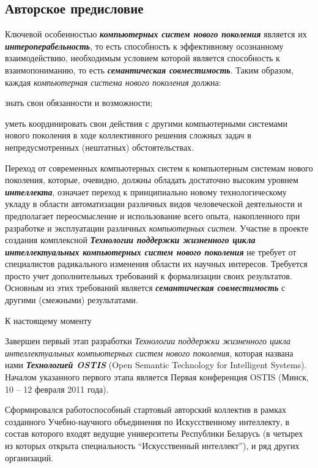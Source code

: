 \begin{partbacktext}
\part*{Авторское предисловие}
\label{chap_preface_auth}

Ключевой особенностью \textbf{\textit{компьютерных систем нового поколения}} является их \textbf{\textit{интероперабельность}}, то есть способность к эффективному осознанному взаимодействию, необходимым условием которой является способность к взаимопониманию, то есть \textbf{\textit{семантическая совместимость}}. Таким образом, каждая \textit{компьютерная система нового поколения} должна:

\begin{textitemize}
	\item знать свои обязанности и возможности;
	\item уметь координировать свои действия с другими компьютерными системами нового поколения в ходе коллективного решения сложных задач в непредусмотренных (нештатных) обстоятельствах.
\end{textitemize}

Переход от современных компьютерных систем к компьютерным системам нового поколения, которые, очевидно, должны обладать достаточно высоким уровнем \textbf{\textit{интеллекта}}, означает переход к принципиально новому технологическому укладу в области автоматизации различных видов человеческой деятельности и предполагает переосмысление и использование всего опыта, накопленного при разработке и эксплуатации различных \textit{компьютерных систем}. Участие в проекте создания комплексной \textbf{\textit{Технологии поддержки жизненного цикла интеллектуальных компьютерных систем нового поколения}} не требует от специалистов радикального изменения области их научных интересов. Требуется просто учет дополнительных требований к формализации своих результатов. Основным из этих требований является \textbf{\textit{семантическая совместимость}} с другими (смежными) результатами.

К настоящему моменту 
\begin{textitemize}
	\item Завершен первый этап разработки \textit{Технологии поддержки жизненного цикла интеллектуальных компьютерных систем нового поколения}, которая названа нами \textbf{\textit{Технологией OSTIS}} (Open Semantic Technology for Intelligent Systems). Началом указанного первого этапа является Первая конференция OSTIS (Минск, 10 -- 12 февраля 2011 года).
	\item Сформировался работоспособный стартовый авторский коллектив в рамках созданного Учебно-научного объединения по Искусственному интеллекту, в состав которого входят ведущие университеты Республики Беларусь (в четырех из которых открыта специальность ``Искусственный интеллект''), и ряд других организаций.
\end{textitemize}



\end{partbacktext}
